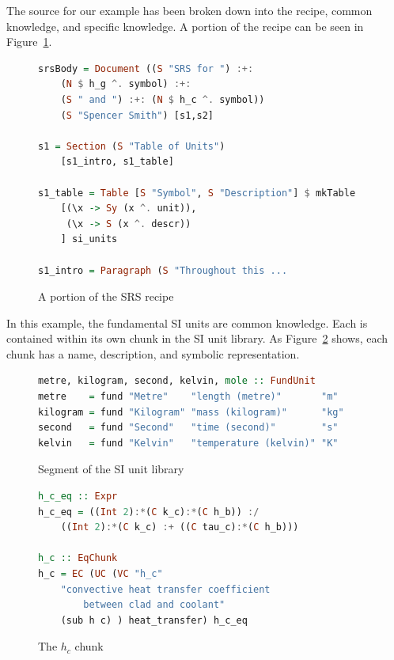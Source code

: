 \documentclass{sig-alternate-05-2015}
\begin{document}
The source for our example has been broken down into the recipe, common
knowledge, and specific knowledge.  A portion of the recipe can be seen in
Figure~\ref{fig:recipe}.

\begin{figure}
\begin{lstlisting}[language=Haskell, frame=single, showstringspaces=false, basicstyle=\tiny]
srsBody = Document ((S "SRS for ") :+: 
    (N $ h_g ^. symbol) :+: 
    (S " and ") :+: (N $ h_c ^. symbol)) 
    (S "Spencer Smith") [s1,s2]

s1 = Section (S "Table of Units") 
    [s1_intro, s1_table]

s1_table = Table [S "Symbol", S "Description"] $ mkTable
    [(\x -> Sy (x ^. unit)),
     (\x -> S (x ^. descr))
    ] si_units

s1_intro = Paragraph (S "Throughout this ...
\end{lstlisting}
\caption{A portion of the SRS recipe}
\label{fig:recipe}
\end{figure}

In this example, the fundamental SI units are common knowledge. Each is
contained within its own chunk in the SI unit library. As
Figure~\ref{fig:know_common} shows, each chunk has a name, description, and
symbolic representation.

\begin{figure}
\begin{lstlisting}[language=Haskell, frame=single, showstringspaces=false, basicstyle=\tiny]
metre, kilogram, second, kelvin, mole :: FundUnit
metre    = fund "Metre"    "length (metre)"       "m"
kilogram = fund "Kilogram" "mass (kilogram)"      "kg"
second   = fund "Second"   "time (second)"        "s"
kelvin   = fund "Kelvin"   "temperature (kelvin)" "K"
\end{lstlisting}
\caption{Segment of the SI unit library}
\label{fig:know_common}
\end{figure}

\begin{figure}
\begin{lstlisting}[language=Haskell, frame=single, showstringspaces=false, basicstyle=\small]
h_c_eq :: Expr
h_c_eq = ((Int 2):*(C k_c):*(C h_b)) :/ 
    ((Int 2):*(C k_c) :+ ((C tau_c):*(C h_b)))

h_c :: EqChunk
h_c = EC (UC (VC "h_c" 
    "convective heat transfer coefficient 
        between clad and coolant"
    (sub h c) ) heat_transfer) h_c_eq
\end{lstlisting}
\caption{The $h_c$ chunk}
\label{fig:know_specific}
\end{figure}
\end{document}
